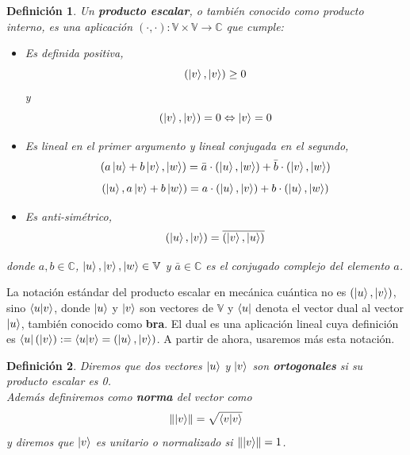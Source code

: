 \documentclass[a4paper]{article}
\newtheorem{deff}{Definición}[section]
\numberwithin{equation}{section}
\newcommand\norm[1]{\lVert#1\rVert}
\begin{document}
\begin{deff}Un \textbf{producto escalar}, o también conocido como producto interno, es una aplicación $(\cdot, \cdot): \mathbb{V}\times\mathbb{V} \longrightarrow \mathbb{C}$ que cumple:
\begin{itemize}

\item Es definida positiva,
\begin{equation}
(\ket{v}, \ket{v}) \geq 0
\end{equation} y
\begin{equation}
(\ket{v}, \ket{v}) = 0 \Leftrightarrow \ket{v} = 0
\end{equation}

\item Es lineal en el primer argumento y lineal conjugada en el segundo,
\begin{equation}
(a\ket{u} + b\ket{v}, \ket{w}) = \bar{a} \cdot(\ket{u}, \ket{w}) + \bar{b} \cdot(\ket{v}, \ket{w})
\end{equation}
\begin{equation}
(\ket{u}, a\ket{v} + b\ket{w}) = a \cdot (\ket{u}, \ket{v}) + b \cdot (\ket{u}, \ket{w})
\end{equation}

\item Es anti-simétrico,
\begin{equation}
(\ket{u}, \ket{v}) = \overline{(\ket{v}, \ket{u})}
\end{equation}
\end{itemize}
donde $a,b \in \mathbb{C}$, $\ket{u}, \ket{v}, \ket{w} \in \mathbb{V}$ y $\bar{a} \in \mathbb{C}$ es el conjugado complejo del elemento $a$.
\end{deff}
La notación estándar del producto escalar en mecánica cuántica no es $(\ket{u}, \ket{v})$, sino $\braket{u|v}$, donde $\ket{u}$ y $\ket{v}$ son vectores de $\mathbb{V}$ y $\bra{u}$ denota el vector dual al vector $\ket{u}$, también conocido como \textbf{bra}. El dual es una aplicación lineal cuya definición es $\bra{u}(\ket{v}) := \braket{u|v} = (\ket{u},\ket{v})$. A partir de ahora, usaremos más esta notación.

\begin{deff}Diremos que dos vectores $\ket{u}$ y $\ket{v}$ son \textbf{ortogonales} si su producto escalar es 0.
\\
Además definiremos como \textbf{norma} del vector como 
\begin{equation}
\norm{\ket{v}} = \sqrt{\braket{v|v}}
\end{equation}
y diremos que $\ket{v}$ es unitario o normalizado si $\norm{\ket{v}} = 1$.
\end{deff}
\end{document}
